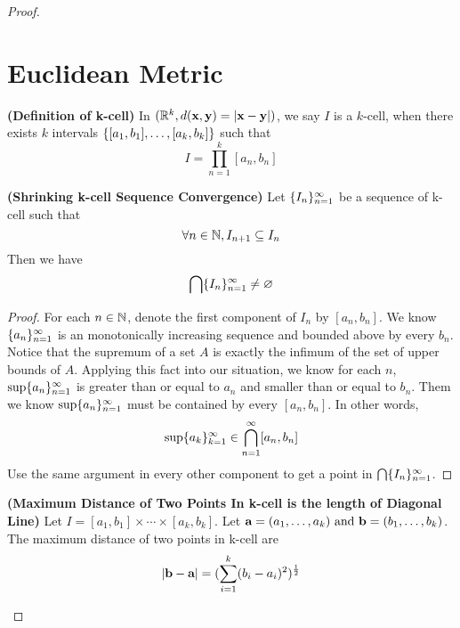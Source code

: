 \documentclass{report}
\begin{document}
\begin{proof}
\section{Euclidean Metric}
\begin{definition}
\label{3.8.1}
\textbf{(Definition of k-cell)} In $(\mathbb{R}^k,d(\textbf{x},\textbf{y})=|\textbf{x}-\textbf{y}|)$,  we say $I$ is a $k$-cell, when there exists  $k$ intervals  $\{ [a_1,b_1],\dots , [a_k,b_k] \}$ such that
 \begin{equation}
   I=\prod_{n=1}^k [a_n,b_n]
\end{equation}
\end{definition}
\begin{lemma}
\label{3.8.2}
\textbf{(Shrinking k-cell Sequence Convergence)} Let $\{ I_n \}_{n=1}^\infty$ be a sequence of  k-cell such that 
\begin{equation}
\forall n\in\mathbb{N}, I_{n+1}\subseteq I_n
\end{equation}
Then we have
\begin{equation}
\bigcap \{ I_n \}_{n=1}^\infty\neq \varnothing
\end{equation}
\end{lemma}
\begin{proof}
For each $n\in\mathbb{N}$, denote the first component of $I_n$ by $[a_n,b_n]$. We know $\{ a_n \}_{n=1}^\infty$ is an monotonically increasing sequence  and bounded above by every $b_n$. Notice that the supremum of a set $A$ is exactly the infimum of the set of upper bounds of $A$. Applying this fact into our situation, we know for each $n$, $\sup \{ a_n \}_{n=1}^\infty$ is greater than or equal to $a_n$ and smaller than or equal to  $b_n$. Them we know $\sup \{ a_n \}_{n=1}^\infty$ must be contained by every $[a_n,b_n]$. In other words,
\begin{equation}
\sup \{ a_k \}_{k=1}^\infty\in \bigcap_{n=1}^\infty [a_n,b_n]
\end{equation}
Use the same argument in every other component to get a point in $\bigcap \{ I_n \}_{n=1}^\infty$. 
\end{proof}
\begin{lemma}
\label{3.8.3}
\textbf{(Maximum Distance of Two Points In k-cell is the length of Diagonal Line)} Let $I=[a_1,b_1]\times\cdots\times[a_k,b_k]$. Let $\textbf{a}=(a_1,\dots, a_k)\text{ and }\textbf{b}=(b_1,\dots, b_k)$. The maximum distance of two points in k-cell are 
\begin{equation}
 |\textbf{b}-\textbf{a}|= (\sum_{i=1}^k (b_i-a_i)^2)^\frac{1}{2}
\end{equation}

\end{lemma}
\end{proof}
\end{document}

